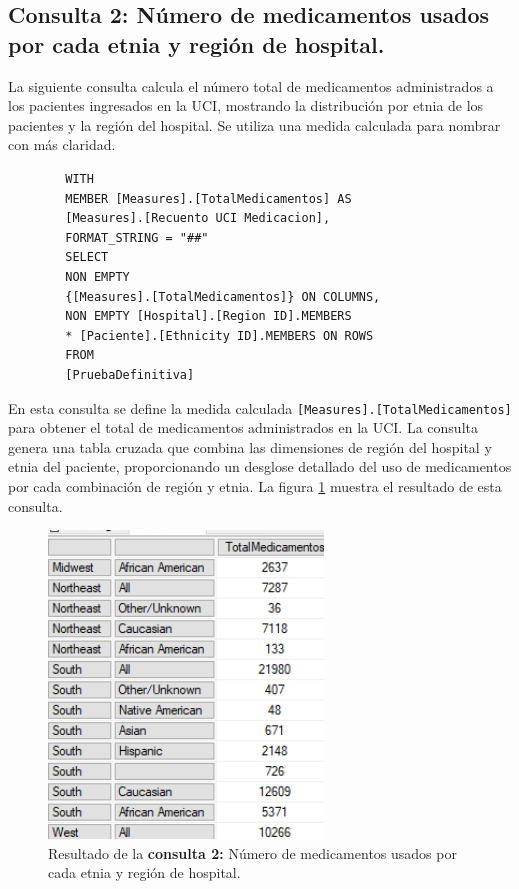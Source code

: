 \documentclass[12pt, a4paper, twoside]{article}
\begin{document}
	\subsection{Consulta 2: Número de medicamentos usados por cada etnia y región de hospital.}
	
	La siguiente consulta calcula el número total de medicamentos administrados a los pacientes ingresados en la UCI, mostrando la distribución por etnia de los pacientes y la región del hospital. Se utiliza una medida calculada para nombrar con más claridad.
	
	\begin{verbatim}
		WITH 
		MEMBER [Measures].[TotalMedicamentos] AS
		[Measures].[Recuento UCI Medicacion],
		FORMAT_STRING = "##"
		SELECT
		NON EMPTY 
		{[Measures].[TotalMedicamentos]} ON COLUMNS,
		NON EMPTY [Hospital].[Region ID].MEMBERS 
		* [Paciente].[Ethnicity ID].MEMBERS ON ROWS
		FROM 
		[PruebaDefinitiva]
	\end{verbatim}
	
	En esta consulta se define la medida calculada \texttt{[Measures].[TotalMedicamentos]} para obtener el total de medicamentos administrados en la UCI. La consulta genera una tabla cruzada que combina las dimensiones de región del hospital y etnia del paciente, proporcionando un desglose detallado del uso de medicamentos por cada combinación de región y etnia. La figura \ref{fig:consulta2} muestra el resultado de esta consulta.
	
	\begin{figure}[H]
		\centering
		\includegraphics[width=0.65\textwidth]{image/consulta2.png}
		\caption{Resultado de la \textbf{consulta 2:}  Número de medicamentos usados por cada etnia y región de hospital.}
		\label{fig:consulta2}
	\end{figure}
	
\end{document}
